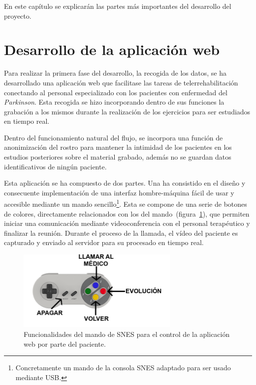 \label{cap:relevantes}

En este capítulo se explicarán las partes más importantes del desarrollo del proyecto.

\section{Desarrollo de la aplicación web}

Para realizar la primera fase del desarrollo, la recogida de los datos, se ha desarrollado una aplicación web que facilitase las tareas de telerrehabilitación conectando al personal especializado con los pacientes con enfermedad del \textit{Parkinson}. Esta recogida se hizo incorporando dentro de sus funciones la grabación a los mismos durante la realización de los ejercicios para ser estudiados en tiempo real. 

Dentro del funcionamiento natural del flujo, se incorpora una función de anonimización del rostro para mantener la intimidad de los pacientes en los estudios posteriores sobre el material grabado, además no se guardan datos identificativos de ningún paciente.

Esta aplicación se ha compuesto de dos partes. Una ha consistido en el diseño y consecuente implementación de una interfaz hombre-máquina fácil de usar y accesible mediante un mando sencillo\footnote{Concretamente un mando de la consola SNES adaptado para ser usado mediante USB.}. Esta se compone de una serie de botones de colores, directamente relacionados con los del mando~(figura~\ref{fig:help}), que permiten iniciar una comunicación mediante videoconferencia con el personal terapéutico y finalizar la reunión. Durante el proceso de la llamada, el vídeo del paciente es capturado y enviado al servidor para su procesado en tiempo real.

\begin{figure}
	\centering
	\includegraphics[width=0.7\textwidth]{img/ayuda.png}
	\caption{Funcionalidades del mando de SNES para el control de la aplicación web por parte del paciente.}
	\label{fig:help}
\end{figure}


